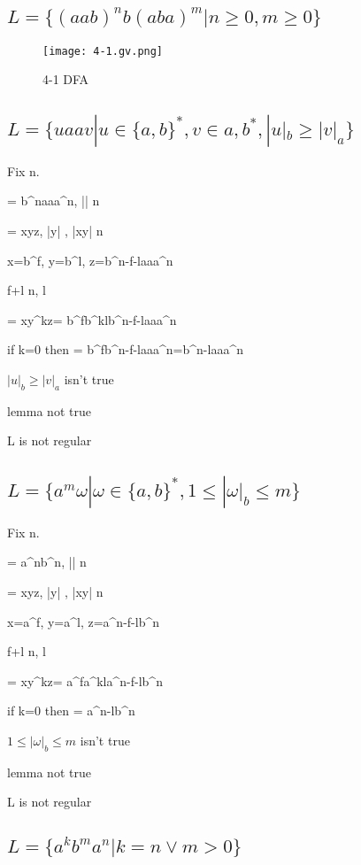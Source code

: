 \documentclass{article}
\begin{document}
\subsection{$L=\{{(aab)}^{n}b(aba)^{m}|n \geq 0, m \geq 0 \}$ }
\begin{figure}[h]
\centering
\texttt{[image: 4-1.gv.png]}
\caption{4-1 DFA}
\end{figure}
\subsection{$L=\{uaav|u \in \{a,b\}^{*}, v \in a,b^{*}, |u|_{b} \geq |v|_{a} \}$}

Fix n. 

\omega = b^{n}aaa^{n}, |\omega| \geq n 

\omega = xyz,  |y|  , |xy| \leq n

x=b^{f},  y=b^{l},  z=b^{n-f-l}aaa^{n}

f+l \leq n, l

\omega = xy^{k}z= b^{f}b^{kl}b^{n-f-l}aaa^{n}

if k=0 then \omega = b^{f}b^{n-f-l}aaa^{n}=b^{n-l}aaa^{n}

$|u|_{b} \geq |v|_{a} $ isn't true

lemma not true

L is not regular

\subsection{$L=\{a^{m}\omega|\omega \in \{a,b \}^{*}, 1 \leq |\omega|_{b} \leq m \}$}

Fix n. 

\omega = a^{n}b^{n}, |\omega| \geq n 

\omega = xyz,  |y|  , |xy| \leq n

x=a^{f},  y=a^{l},  z=a^{n-f-l}b^{n}

f+l \leq n, l

\omega = xy^{k}z= a^{f}a^{kl}a^{n-f-l}b^{n}

if k=0 then \omega = a^{n-l}b^{n}

$1 \leq |\omega|_{b} \leq m $ isn't true

lemma not true

L is not regular

\subsection{$L=\{a^{k}b^{m}a^{n} | k=n \vee m > 0 \}$}
\end{document}
